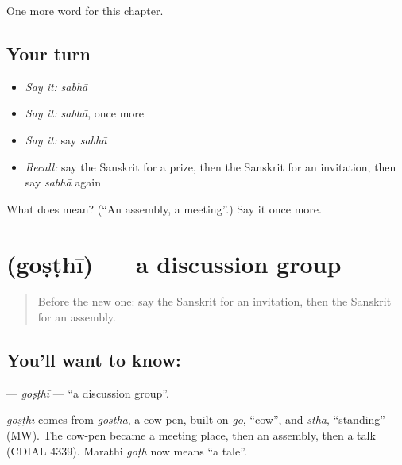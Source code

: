 \begin{grammarlens}[title={What you've built}]
One more word for this chapter.
\end{grammarlens}

\subsection*{Your turn}
\begin{itemize}
\raggedright
  \item \emph{Say it:} \emph{sabhā}
  \item \emph{Say it:} \emph{sabhā}, once more
  \item \emph{Say it:} say \emph{sabhā}
  \item \emph{Recall:} say the Sanskrit for a prize, then the Sanskrit for an invitation, then say \emph{sabhā} again
\end{itemize}

\begin{tcolorbox}[breakable,colback=teal!4,colframe=teal!35!black,title={Before you move on}]
What does  mean? (\textquotedblleft{}An assembly, a meeting\textquotedblright{}.) Say it once more.
\end{tcolorbox}
\section[\texorpdfstring{\sk{गोष्ठी} (goṣṭhī)}{गोष्ठी (goṣṭhī)}]{ (goṣṭhī) — a discussion group}

\label{lesson:SA-C194-gosthi}



\begin{quote}
Before the new one: say the Sanskrit for an invitation, then the Sanskrit for an assembly.
\end{quote}

\subsection*{You'll want to know: }
\textbf{} — \emph{goṣṭhī} — \textquotedblleft{}a discussion group\textquotedblright{}.

\begin{cousinweb}
\emph{goṣṭhī} comes from \emph{goṣṭha}, a cow-pen, built on \emph{go}, \textquotedblleft{}cow\textquotedblright{}, and \emph{stha}, \textquotedblleft{}standing\textquotedblright{} (MW). The cow-pen became a meeting place, then an assembly, then a talk (CDIAL 4339). Marathi \emph{goṭh} now means \textquotedblleft{}a tale\textquotedblright{}.
\end{cousinweb}


